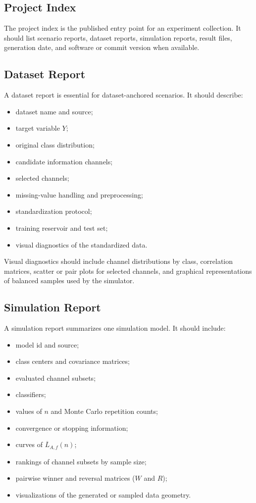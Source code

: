 \documentclass[11pt,a4paper]{article}
\begin{document}
\subsection{Project Index}

The project index is the published entry point for an experiment collection. It should list scenario reports, dataset reports, simulation reports, result files, generation date, and software or commit version when available.

\subsection{Dataset Report}

A dataset report is essential for dataset-anchored scenarios. It should describe:
\begin{itemize}
    \item dataset name and source;
    \item target variable $Y$;
    \item original class distribution;
    \item candidate information channels;
    \item selected channels;
    \item missing-value handling and preprocessing;
    \item standardization protocol;
    \item training reservoir and test set;
    \item visual diagnostics of the standardized data.
\end{itemize}

Visual diagnostics should include channel distributions by class, correlation matrices, scatter or pair plots for selected channels, and graphical representations of balanced samples used by the simulator.

\subsection{Simulation Report}

A simulation report summarizes one simulation model. It should include:
\begin{itemize}
    \item model id and source;
    \item class centers and covariance matrices;
    \item evaluated channel subsets;
    \item classifiers;
    \item values of $n$ and Monte Carlo repetition counts;
    \item convergence or stopping information;
    \item curves of $\overline{L}_{A,f}(n)$;
    \item rankings of channel subsets by sample size;
    \item pairwise winner and reversal matrices ($W$ and $R$);
    \item visualizations of the generated or sampled data geometry.
\end{itemize}
\end{document}
